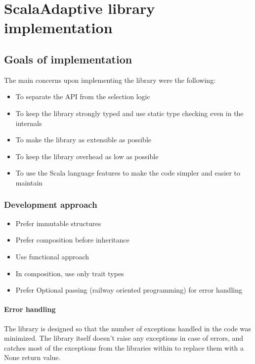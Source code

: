 \chapter{ScalaAdaptive library implementation}
\label{chap:implementation}

\section{Goals of implementation}

The main concerns upon implementing the library were the following:

\begin{itemize}
	\item To separate the API from the selection logic
	\item To keep the library strongly typed and use static type checking even in the internals
	\item To make the library as extensible as possible
	\item To keep the library overhead as low as possible
	\item To use the Scala language features to make the code simpler and easier to maintain
\end{itemize}

\subsection{Development approach}

\begin{itemize}
	\item Prefer immutable structures
	\item Prefer composition before inheritance
	\item Use functional approach
	\item In composition, use only trait types
	\item Prefer Optional passing (railway oriented programming) for error handling
\end{itemize}

\subsubsection{Error handling}

The library is designed so that the number of exceptions handled in the code was minimized. The library itself doesn't raise any exceptions in case of errors, and catches most of the exceptions from the libraries within to replace them with a None return value.

